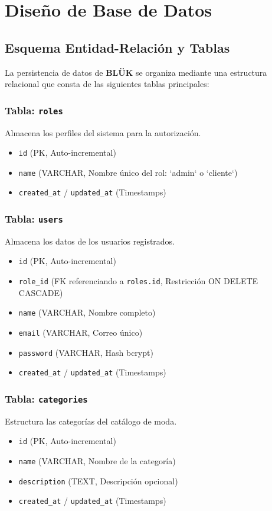 \chapter{Diseño de Base de Datos}

\section{Esquema Entidad-Relación y Tablas}
La persistencia de datos de \textbf{BLÜK} se organiza mediante una estructura relacional que consta de las siguientes tablas principales:

\subsection{Tabla: \texttt{roles}}
Almacena los perfiles del sistema para la autorización.
\begin{itemize}
    \item \texttt{id} (PK, Auto-incremental)
    \item \texttt{name} (VARCHAR, Nombre único del rol: `admin` o `cliente`)
    \item \texttt{created\_at} / \texttt{updated\_at} (Timestamps)
\end{itemize}

\subsection{Tabla: \texttt{users}}
Almacena los datos de los usuarios registrados.
\begin{itemize}
    \item \texttt{id} (PK, Auto-incremental)
    \item \texttt{role\_id} (FK referenciando a \texttt{roles.id}, Restricción ON DELETE CASCADE)
    \item \texttt{name} (VARCHAR, Nombre completo)
    \item \texttt{email} (VARCHAR, Correo único)
    \item \texttt{password} (VARCHAR, Hash bcrypt)
    \item \texttt{created\_at} / \texttt{updated\_at} (Timestamps)
\end{itemize}

\subsection{Tabla: \texttt{categories}}
Estructura las categorías del catálogo de moda.
\begin{itemize}
    \item \texttt{id} (PK, Auto-incremental)
    \item \texttt{name} (VARCHAR, Nombre de la categoría)
    \item \texttt{description} (TEXT, Descripción opcional)
    \item \texttt{created\_at} / \texttt{updated\_at} (Timestamps)
\end{itemize}

